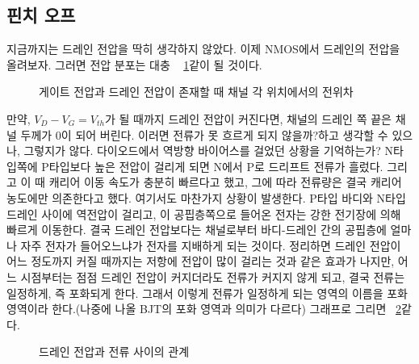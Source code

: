 \subsection{핀치 오프}
지금까지는 드레인 전압을 딱히 생각하지 않았다. 이제 NMOS에서 드레인의 전압을 올려보자. 그러면 전압 분포는 대충 \figurename~ \ref{fig:ch potential variation}\과 같이 될 것이다.
\begin{figure}[!hbp]
    \centering
    \caption{게이트 전압과 드레인 전압이 존재할 때 채널 각 위치에서의 전위차}\label{fig:ch potential variation}
\end{figure}
만약, $V_D-V_G=V_{th}$가 될 때까지 드레인 전압이 커진다면, 채널의 드레인 쪽 끝은 채널 두께가 0이 되어 버린다. 이러면 전류가 못 흐르게 되지 않을까?하고 생각할 수 있으나, 그렇지가 않다.
다이오드에서 역방향 바이어스를 걸었던 상황을 기억하는가? N타입쪽에 P타입보다 높은 전압이 걸리게 되면 N에서 P로 드리프트 전류가 흘렀다. 그리고 이 때 캐리어 이동 속도가 충분히 빠르다고 했고, 그에 따라 전류량은 결국 캐리어 농도에만 의존한다고 했다.
여기서도 마찬가지 상황이 발생한다. P타입 바디와 N타입 드레인 사이에 역전압이 걸리고, 이 공핍층쪽으로 들어온 전자는 강한 전기장에 의해 빠르게 이동한다. 결국 드레인 전압보다는 채널로부터 바디-드레인 간의 공핍층에 얼마나 자주 전자가 들어오느냐가 전자를 지배하게 되는 것이다.
정리하면 드레인 전압이 어느 정도까지 커질 때까지는 저항에 전압이 많이 걸리는 것과 같은 효과가 나지만, 어느 시점부터는 점점 드레인 전압이 커지더라도 전류가 커지지 않게 되고, 결국 전류는 일정하게, 즉 포화되게 한다.
그래서 이렇게 전류가 일정하게 되는 영역의 이름을 포화 영역이라 한다.(나중에 나올 BJT의 포화 영역과 의미가 다르다) 그래프로 그리면 \figurename~\ref{fig:vds vs id curve}\와 같다.
\begin{figure}[!hbp]
    \centering
    \caption{드레인 전압과 전류 사이의 관계}\label{fig:vds vs id curve}
\end{figure}

